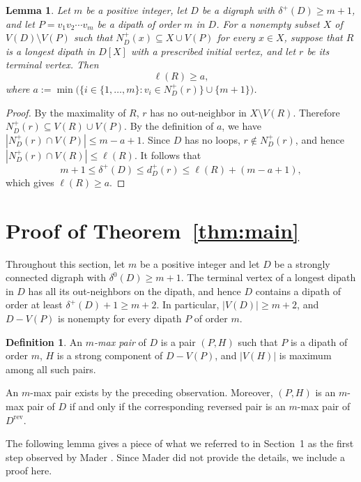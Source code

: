 \documentclass[12pt]{article}
\numberwithin{equation}{section}
\theoremstyle{plain}
\newtheorem{lemma}[theorem]{Lemma}
\theoremstyle{definition}
\newtheorem{definition}[theorem]{Definition}
\begin{document}
\begin{lemma}\label{lem:count}
Let $m$ be a positive integer, let $D$ be a digraph with $\delta^+(D)\ge m+1$, and let $P=v_1v_2\cdots v_m$ be a dipath of order $m$ in $D$.
For a nonempty subset $X$ of $V(D)\setminus V(P)$ such that $N_D^+(x)\subseteq X\cup V(P)$ for every $x\in X$, suppose that $R$ is a longest dipath in $D[X]$ with a prescribed initial vertex, and let $r$ be its terminal vertex.
Then \[ 
\ell(R) \ge a,
\] 
where $a:=\min\bigl(\{i\in\{1,\ldots,m\}:v_i\in N_D^+(r)\}\cup\{m+1\}\bigr)$.
\end{lemma}

\begin{proof}
By the maximality of $R$, $r$ has no out-neighbor in $X\setminus V(R)$. 
Therefore $N_D^+(r)\subseteq V(R)\cup V(P)$.
By the definition of $a$, we have $|N_D^+(r)\cap V(P)|\le m-a+1$.
Since $D$ has no loops, $r\notin N_D^+(r)$, and hence $|N_D^+(r)\cap V(R)|\le\ell(R)$.
It follows that
\[
m+1\le\delta^+(D)\le d_D^+(r)\le\ell(R)+(m-a+1),
\]
which gives $\ell(R)\ge a$.
\end{proof}

\section{Proof of Theorem~\ref{thm:main}}\label{sec:proof}

Throughout this section, let $m$ be a positive integer and let $D$ be a strongly connected digraph with $\delta^0(D)\ge m+1$.
The terminal vertex of a longest dipath in $D$ has all its out-neighbors on the dipath, and hence $D$ contains a dipath of order at least $\delta^+(D)+1\ge m+2$.
In particular, $|V(D)|\ge m+2$, and $D-V(P)$ is nonempty for every dipath $P$ of order $m$.

\begin{definition}\label{def:$m$-max-pair}
An \emph{$m$-max pair} of $D$ is a pair $(P,H)$ such that $P$ is a dipath of order $m$, $H$ is a strong component of $D-V(P)$, and $|V(H)|$ is maximum among all such pairs.
\end{definition}

An $m$-max pair exists by the preceding observation.
Moreover, $(P,H)$ is an $m$-max pair of $D$ if and only if the corresponding reversed pair is an $m$-max pair of $D^{\mathrm{rev}}$.

The following lemma gives a piece of what we referred to in Section~1 as the first step observed by Mader \cite{Mader12}. Since Mader did not provide the details, we include a proof here.
\end{document}
